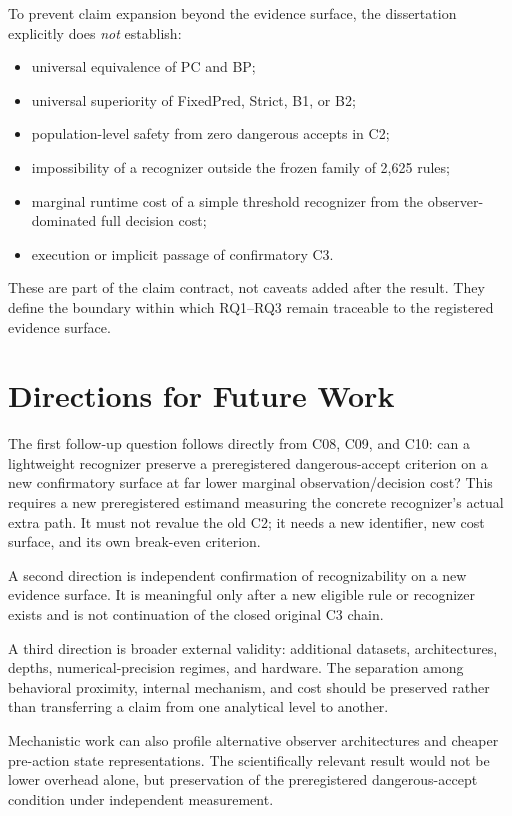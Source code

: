 To prevent claim expansion beyond the evidence surface, the dissertation explicitly
does \emph{not} establish:
\begin{itemize}
  \item universal equivalence of PC and BP;
  \item universal superiority of FixedPred, Strict, B1, or B2;
  \item population-level safety from zero dangerous accepts in C2;
  \item impossibility of a recognizer outside the frozen family of 2,625 rules;
  \item marginal runtime cost of a simple threshold recognizer from the observer-dominated full decision cost;
  \item execution or implicit passage of confirmatory C3.
\end{itemize}
These are part of the claim contract, not caveats added after the result. They define
the boundary within which RQ1--RQ3 remain traceable to the registered evidence surface.

\section{Directions for Future Work}
\label{sec:discussion-future-en}

The first follow-up question follows directly from C08, C09, and C10: can a lightweight
recognizer preserve a preregistered dangerous-accept criterion on a new confirmatory
surface at far lower marginal observation/decision cost? This requires a new
preregistered estimand measuring the concrete recognizer's actual extra path. It must
not revalue the old C2; it needs a new identifier, new cost surface, and its own
break-even criterion.

A second direction is independent confirmation of recognizability on a new evidence
surface. It is meaningful only after a new eligible rule or recognizer exists and is
not continuation of the closed original C3 chain.

A third direction is broader external validity: additional datasets, architectures,
depths, numerical-precision regimes, and hardware. The separation among behavioral
proximity, internal mechanism, and cost should be preserved rather than transferring a
claim from one analytical level to another.

Mechanistic work can also profile alternative observer architectures and cheaper
pre-action state representations. The scientifically relevant result would not be lower
overhead alone, but preservation of the preregistered dangerous-accept condition under
independent measurement.


